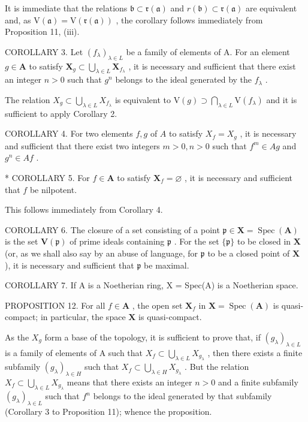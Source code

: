 It is immediate that the relations \(\mathfrak{b} \subset \mathfrak{r}(\mathfrak{a})\) and \(r(\mathfrak{b}) \subset \mathfrak{r}(\mathfrak{a})\) are equivalent and, as \(\mathrm{V}(\mathfrak{a}) = \mathrm{V}(\mathfrak{r}(\mathfrak{a}))\) , the corollary follows immediately from Proposition 11, (iii).

COROLLARY 3. Let \((f_{\lambda})_{\lambda \in L}\) be a family of elements of A. For an element \(g \in \mathbf{A}\) to satisfy \(\mathbf{X}_g \subset \bigcup_{\lambda \in L} \mathbf{X}_{f_\lambda}\) , it is necessary and sufficient that there exist an integer \(n > 0\) such that \(g^n\) belongs to the ideal generated by the \(f_\lambda\) .

The relation \(X_{g} \subset \bigcup_{\lambda \in L} X_{f_{\lambda}}\) is equivalent to \(\mathrm{V}(g) \supset \bigcap_{\lambda \in L} \mathrm{V}(f_{\lambda})\) and it is sufficient to apply Corollary 2.

COROLLARY 4. For two elements \(f, g\) of \(A\) to satisfy \(X_f = X_g\) , it is necessary and sufficient that there exist two integers \(m > 0, n > 0\) such that \(f^m \in Ag\) and \(g^n \in Af\) .

* COROLLARY 5. For \(f \in \mathbf{A}\) to satisfy \(\mathbf{X}_f = \varnothing\) , it is necessary and sufficient that \(f\) be nilpotent.

This follows immediately from Corollary 4.

COROLLARY 6. The closure of a set consisting of a point \(\mathfrak{p} \in \mathbf{X} = \operatorname{Spec}(\mathbf{A})\) is the set \(\mathbf{V}(\mathfrak{p})\) of prime ideals containing \(\mathfrak{p}\) . For the set \(\{\mathfrak{p}\}\) to be closed in \(\mathbf{X}\) (or, as we shall also say by an abuse of language, for \(\mathfrak{p}\) to be a closed point of \(\mathbf{X}\) ), it is necessary and sufficient that \(\mathfrak{p}\) be maximal.

COROLLARY 7. If A is a Noetherian ring, X = Spec(A) is a Noetherian space.

PROPOSITION 12. For all \(f \in \mathbf{A}\) , the open set \(\mathbf{X}_f\) in \(\mathbf{X} = \operatorname{Spec}(\mathbf{A})\) is quasi-compact; in particular, the space \(\mathbf{X}\) is quasi-compact.

As the \(X_{g}\) form a base of the topology, it is sufficient to prove that, if \((g_{\lambda})_{\lambda\in L}\) is a family of elements of A such that \(X_{f}\subset\bigcup_{\lambda\in L}X_{g_{\lambda}}\) , then there exists a finite subfamily \((g_{\lambda})_{\lambda\in H}\) such that \(X_{f}\subset\bigcup_{\lambda\in H}X_{g_{\lambda}}\) . But the relation \(X_{f}\subset\bigcup_{\lambda\in L}X_{g_{\lambda}}\) means that there exists an integer \(n > 0\) and a finite subfamily \((g_{\lambda})_{\lambda\in L}\) such that \(f^{n}\) belongs to the ideal generated by that subfamily (Corollary 3 to Proposition 11); whence the proposition.

